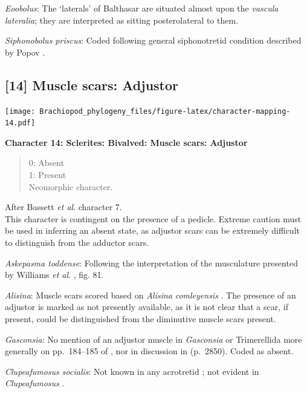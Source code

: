 \documentclass[]{book}
\theoremstyle{definition}
\theoremstyle{definition}
\theoremstyle{definition}
\theoremstyle{remark}
\begin{document}
\emph{Eoobolus}: The `laterals' of Balthasar \citeyearpar[fig.
5]{Balthasar2009Thebrachiopod} are situated almost upon the
\emph{vascula} \emph{lateralia}; they are interpreted as sitting
posterolateral to them.

\emph{Siphonobolus priscus}: Coded following general siphonotretid
condition described by Popov \citeyearpar[p.~407]{Popov1992TheCambrian}.

\hypertarget{muscle-scars-adjustor}{%
\subsection*{{[}14{]} Muscle scars:
Adjustor}\label{muscle-scars-adjustor}}

\texttt{[image: Brachiopod\_phylogeny\_files/figure-latex/character-mapping-14.pdf]}

\textbf{Character 14: Sclerites: Bivalved: Muscle scars: Adjustor}

\begin{quote}
0: Absent\\
1: Present\\
Neomorphic character.
\end{quote}

After Bassett \emph{et al}.
\citeyearpar{Bassett2001Functionalmorphology} character 7.\\
This character is contingent on the presence of a pedicle. Extreme
caution must be used in inferring an absent state, as adjustor scars can
be extremely difficult to distinguish from the adductor scars.

\emph{Askepasma toddense}: Following the interpretation of the
musculature presented by Williams \emph{et al}.
\citeyearpar{Williams2000BrachiopodaLinguliformea}, fig. 81.

\emph{Alisina}: Muscle scars scored based on \emph{Alisina}
\emph{comleyensis} \citep{Bassett2001Functionalmorphology}. The presence
of an adjustor is marked as not presently available, as it is not clear
that a scar, if present, could be distinguished from the diminutive
muscle scars present.

\emph{Gasconsia}: No mention of an adjustor muscle in \emph{Gasconsia}
or Trimerellida more generally on pp.~184--185 of
\citet{Williams2000BrachiopodaLinguliformea}, nor in discussion in
\citet{Williams2007PartH} (p.~2850). Coded as absent.

\emph{Clupeafumosus socialis}: Not known in any acrotretid
\citep{Williams2000BrachiopodaLinguliformea}; not evident in
\emph{Clupeafumosus} \citep{Topper2013Reappraisalof}.
\end{document}
